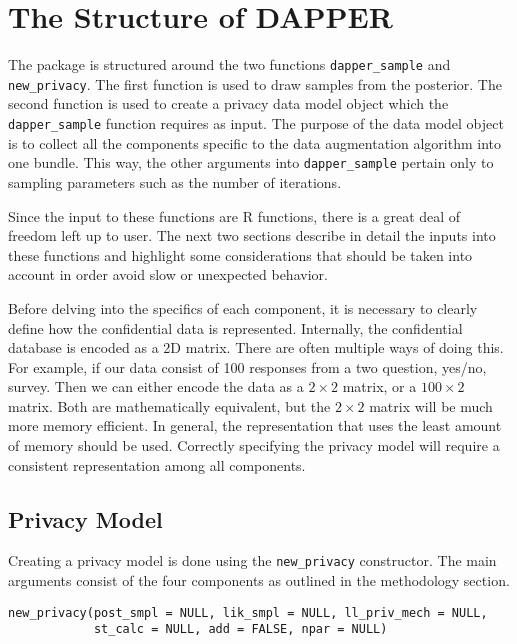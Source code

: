 \hypertarget{the-structure-of-dapper}{%
\section{The Structure of DAPPER}\label{the-structure-of-dapper}}

The package is structured around the two functions \texttt{dapper\_sample} and
\texttt{new\_privacy}. The first function is used to draw samples from the
posterior. The second function is used to create a privacy data model object
which the \texttt{dapper\_sample} function requires as input. The purpose of the data model
object is to collect all the components specific to the data augmentation algorithm
into one bundle. This way, the other arguments into \texttt{dapper\_sample} pertain only
to sampling parameters such as the number of iterations.

Since the input to these functions are R functions, there is a great deal of freedom
left up to user. The next two sections describe in detail the inputs into
these functions and highlight some considerations that should be taken
into account in order avoid slow or unexpected behavior.

Before delving into the specifics of each component, it is necessary to clearly
define how the confidential data is represented. Internally, the
confidential database is encoded as a 2D matrix. There are often multiple ways
of doing this. For example, if our data consist
of 100 responses from a two question, yes/no, survey. Then we can either encode
the data as a \(2 \times 2\) matrix, or a \(100 \times 2\) matrix. Both are mathematically
equivalent, but the \(2 \times 2\) matrix will be much more memory efficient.
In general, the representation that uses the least amount of memory should be
used. Correctly specifying the privacy model will require a consistent
representation among all components.

\hypertarget{privacy-model}{%
\subsection{Privacy Model}\label{privacy-model}}

Creating a privacy model is done using the \texttt{new\_privacy} constructor. The
main arguments consist of the four components as outlined in the methodology
section.

\begin{verbatim}
new_privacy(post_smpl = NULL, lik_smpl = NULL, ll_priv_mech = NULL,
            st_calc = NULL, add = FALSE, npar = NULL)
\end{verbatim}

